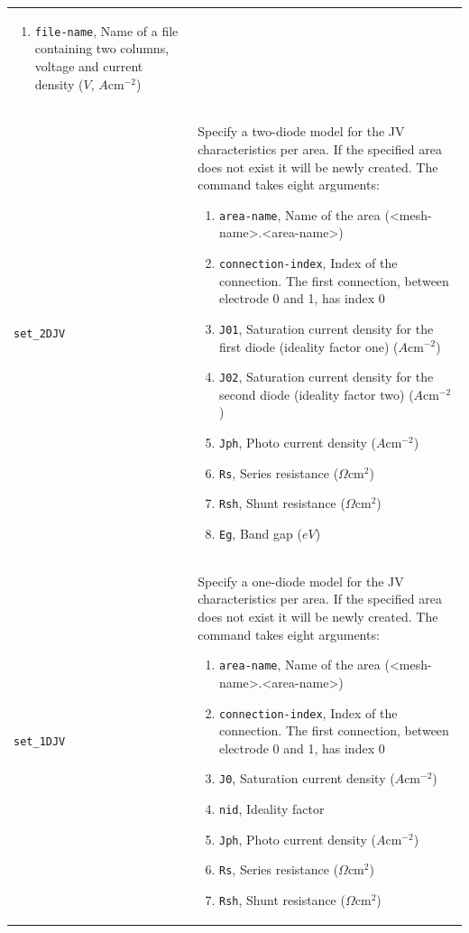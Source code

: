 \documentclass[noshowpacs,preprintnumbers,amsmath,amssymb, letter]{revtex4}
\begin{document}
\begin{longtable}{p{}p{}}
\begin{enumerate}
\item \texttt{file-name}, Name of a file containing two columns, voltage and current density ($V$, $A \text{cm}^{-2}$)
\end{enumerate}\\
\texttt{set\_2DJV}	&  Specify a two-diode model for the JV characteristics per area. If the specified area does not exist it will be newly created. The command takes eight arguments:
\begin{enumerate}
\item \texttt{area-name}, Name of the area (\textless mesh-name\textgreater .\textless area-name\textgreater )
\item \texttt{connection-index}, Index of the connection. The first connection, between electrode 0 and 1,  has index 0
\item \texttt{J01}, Saturation current density for the first diode (ideality factor one)  ($A \text{cm}^{-2}$)
\item \texttt{J02}, Saturation current density for the second diode (ideality factor two)  ($A \text{cm}^{-2}$)
\item \texttt{Jph}, Photo current density ($A \text{cm}^{-2}$)
\item \texttt{Rs}, Series resistance ($\Omega \text{cm}^2$)
\item \texttt{Rsh}, Shunt resistance ($\Omega \text{cm}^2$)
\item \texttt{Eg}, Band gap ($eV$)
\end{enumerate}\\
\texttt{set\_1DJV}	&  Specify a one-diode model for the JV characteristics per area. If the specified area does not exist it will be newly created. The command takes eight arguments:
\begin{enumerate}
\item \texttt{area-name}, Name of the area (\textless mesh-name\textgreater .\textless area-name\textgreater )
\item \texttt{connection-index}, Index of the connection. The first connection, between electrode 0 and 1,  has index 0
\item \texttt{J0}, Saturation current density ($A \text{cm}^{-2}$)
\item \texttt{nid}, Ideality factor
\item \texttt{Jph}, Photo current density ($A \text{cm}^{-2}$)
\item \texttt{Rs}, Series resistance ($\Omega \text{cm}^2$)
\item \texttt{Rsh}, Shunt resistance ($\Omega \text{cm}^2$)

\end{enumerate}
\end{longtable}
\end{document}

